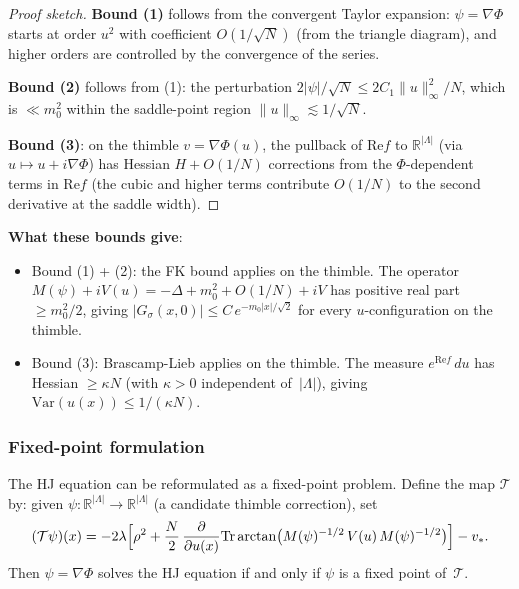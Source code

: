 \documentclass[12pt]{article}
\theoremstyle{definition}
\theoremstyle{remark}
\newcommand{\R}{\mathbb{R}}
\newcommand{\Var}{\mathrm{Var}}
\newcommand{\Tr}{\mathrm{Tr}}
\newcommand{\La}{\Lambda}
\newcommand{\re}{\mathrm{Re}}
\begin{document}
\begin{proof}[Proof sketch]
\textbf{Bound (1)} follows from the convergent Taylor expansion:
$\psi = \nabla\Phi$ starts at order $u^2$ with coefficient
$O(1/\sqrt{N})$ (from the triangle diagram), and higher orders
are controlled by the convergence of the series.

\textbf{Bound (2)} follows from (1): the perturbation
$2|\psi|/\sqrt{N} \le 2C_1\|u\|_\infty^2/N$, which is
$\ll m_0^2$ within the saddle-point region
$\|u\|_\infty \lesssim 1/\sqrt{N}$.

\textbf{Bound (3)}: on the thimble $v = \nabla\Phi(u)$, the
pullback of $\re f$ to $\R^{|\La|}$ (via $u \mapsto u+i\nabla\Phi$)
has Hessian $H + O(1/N)$ corrections from the $\Phi$-dependent
terms in $\re f$ (the cubic and higher terms contribute $O(1/N)$
to the second derivative at the saddle width).
\end{proof}

\textbf{What these bounds give}:
\begin{itemize}
\item Bound (1) + (2): the FK bound applies on the thimble.
  The operator $M(\psi) + iV(u) = -\Delta + m_0^2 + O(1/N) + iV$
  has positive real part $\ge m_0^2/2$, giving
  $|G_\sigma(x,0)| \le C\,e^{-m_0|x|/\sqrt{2}}$ for every
  $u$-configuration on the thimble.
\item Bound (3): Brascamp-Lieb applies on the thimble.
  The measure $e^{\re f}\,du$ has Hessian $\ge \kappa N$
  (with $\kappa > 0$ independent of~$|\La|$), giving
  $\Var(u(x)) \le 1/(\kappa N)$.
\end{itemize}

\subsubsection{Fixed-point formulation}

The HJ equation can be reformulated as a fixed-point problem.
Define the map $\mathcal{T}$ by: given $\psi : \R^{|\La|} \to
\R^{|\La|}$ (a candidate thimble correction), set
\begin{equation}
  (\mathcal{T}\psi)(x)
    = -2\lambda\Bigl[\rho^2 + \frac{N}{2}\,
      \frac{\partial}{\partial u(x)}
      \Tr\arctan\bigl(M(\psi)^{-1/2}\,V(u)\,M(\psi)^{-1/2}\bigr)
    \Bigr] - v_*.
\end{equation}
Then $\psi = \nabla\Phi$ solves the HJ equation if and only if
$\psi$ is a fixed point of~$\mathcal{T}$.
\end{document}
